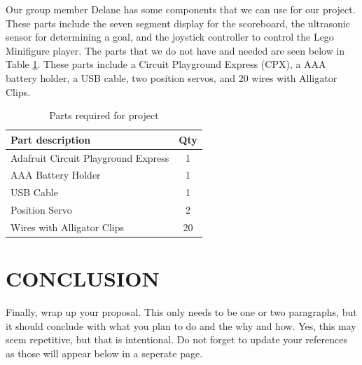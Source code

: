 \documentclass[12pt]{article}
\begin{document}
Our group member Delane has some components that we can use for our project. These parts include the seven segment display for the
scoreboard, the ultrasonic sensor for determining a goal, and the joystick controller to control the Lego Minifigure player.
The parts that we do not have and needed are seen below in Table \ref{table:parts_list}. These parts include a Circuit Playground Express (CPX),
 a AAA battery holder, a USB cable, two position servos, and 20 wires with Alligator Clips.

\begin{table}[ht]
  \caption{Parts required for project}
  \label{table:parts_list}
  \begin{center}
  \begin{tabular}{|p{3in}|c|}
  
  \hline
  Part description & Qty\\
  \hline
  \hline
  Adafruit Circuit Playground Express & 1 \\
  \hline
  AAA Battery Holder & 1 \\
  \hline
  USB Cable & 1 \\
  \hline
  Position Servo & 2\\
  \hline 
  Wires with Alligator Clips & 20\\
  \hline
 
  
  \end{tabular}
  \end{center}
  \end{table}


\newpage

\section{CONCLUSION}
Finally, wrap up your proposal. This only needs to be one or two paragraphs, but it should conclude with what you plan to do and the why and how. Yes, this may seem repetitive, 
but that is intentional. Do not forget to update your references as those will appear below in a seperate page.
















\newpage
\printbibliography[heading=subbibintoc]
%
%
\end{document}
